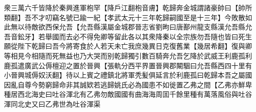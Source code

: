 衆三萬六千皆降於秦興進軍枹罕【降戶江翻枹音膚】乾歸奔金城謂諸豪帥曰【帥所類翻】吾不才叨竊名號已踰一紀【孝武太元十三年乾歸嗣國至是十三年】今敗散如此無以待敵欲西保允吾【允吾縣漢屬金城郡晉志省劉昫曰唐鄯州龍支縣漢允吾縣允吾音鈆牙】若舉國而去必不得免卿等留此各以其衆降秦以全宗族勿吾隨也皆曰死生願從陛下乾歸曰吾今將寄食於人若天未亡我庶幾異日克復舊業【幾居希翻】復與卿等相見今相隨而死無益也乃大哭而别乾歸獨引數百騎奔允吾乞降於武威王利鹿孤利鹿孤遣廣武公傉檀迎之置於晉興【張軌分西平界置晉興郡闞駰曰允吾縣西四十里有小晉興城傉奴沃翻】待以上賓之禮鎮北將軍秃髪俱延言於利鹿孤曰乾歸本吾之屬國因亂自尊今勢窮歸命非其誠欵若逃歸姚氏必為國患不如徙置乙弗之間【乙弗亦鮮卑種居西北海史曰吐谷渾北有乙弗勿敵國國有曲海海周囬千餘里種有萬落風俗與吐谷渾同北史又曰乙弗世為吐谷渾渠